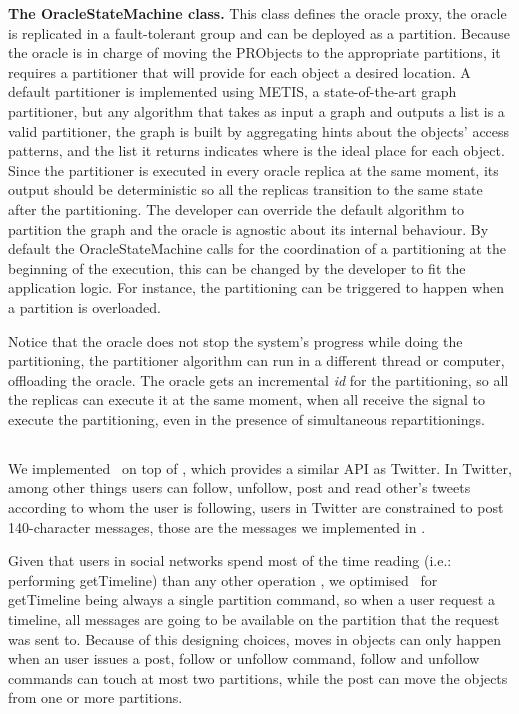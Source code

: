 \textbf{The OracleStateMachine class.} This class defines the oracle proxy, the oracle is replicated in a fault-tolerant
group and can be deployed as a partition. Because the oracle is in charge of moving the PRObjects to the appropriate 
partitions, it requires a partitioner that will provide for each object a desired location. A default partitioner is implemented using METIS, a state-of-the-art graph partitioner, but any algorithm that takes as input a graph and outputs a list is a valid
partitioner, the graph is built by aggregating hints about the objects' access patterns, and the list it returns indicates where
is the ideal place for each object. Since the partitioner is executed in every oracle replica at the same moment,
its output should be deterministic so all the replicas transition to the same state after the partitioning. 
The developer can override the default algorithm to partition the graph and the oracle is agnostic about its internal behaviour.
By default the OracleStateMachine calls for the coordination of a partitioning at the beginning of the execution, this can be
changed by the developer to fit the application logic. For instance, the partitioning can be triggered to 
happen when a partition is overloaded.

Notice that the oracle does not stop the system's progress while doing the partitioning, the partitioner algorithm can
 run in a different thread or computer, offloading the oracle. The oracle gets an incremental \emph{id} for the partitioning, 
 so all the replicas can execute it at the same moment, when all receive the signal to execute the partitioning, 
 even in the presence of simultaneous repartitionings.

\subsection{\appname}
\label{sec:imp:\appname}
We implemented \appname\ on top of \libname, which provides a similar API as Twitter. In Twitter, among other things
users can follow, unfollow, post and read other's tweets according to whom the user is following, users in Twitter are
constrained to post 140-character messages, those are the messages we implemented in \appname.

Given that users in social networks spend most of the time reading (i.e.: performing getTimeline) than any other operation 
\cite{facebookTAO}, we optimised \appname\ for getTimeline being always a single partition command, so when a
user request a timeline, all messages are going to be available on the partition that the request was sent to.
Because of this designing choices, moves in objects can only happen when an user issues a post, follow or unfollow
command, follow and unfollow commands can touch at most two partitions, while the post can move the objects from
one or more partitions.

